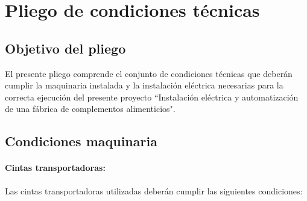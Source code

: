 \newpage

\section {Pliego de condiciones técnicas}

\subsection{Objetivo del pliego}
El presente pliego comprende el conjunto de condiciones técnicas que deberán cumplir la maquinaria instalada y la instalación eléctrica necesarias para la correcta ejecución del presente proyecto ``Instalación eléctrica y automatización de una fábrica de complementos alimenticios". 



\subsection{Condiciones maquinaria}
\paragraph{Cintas transportadoras:}
		Las cintas transportadoras utilizadas deberán cumplir las siguientes condiciones:
		

